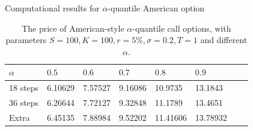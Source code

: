\documentclass[cjk,10pt]{beamer}
\begin{document}
\begin{frame}{Computational results for $\alpha$-quantile American option}
\begin{table}[p]
\caption{The price of American-style $\alpha$-quantile call options, with parameters
	$S=100, K=100, r=5\%, \sigma=0.2, T=1$ and different $\alpha$. }
\begin{center}
\begin{tabular}{l|lllllll}
$\alpha$ & $0.5$ & $0.6$ & $0.7$ & $0.8$ & $0.9$       \\
\hline
18 steps & 6.10629 & 7.57527 & 9.16086 & 10.9735 & 13.1843\\
36 steps & 6.26644 & 7.72127 & 9.32848 & 11.1789 & 13.4651\\
\hline
Extra & 6.45135 & 7.88984 & 9.52202 & 11.41606 & 13.78932 
\end{tabular}
\end{center}
\label{fig:amerc}
\end{table}%

\end{frame}
\end{document}
